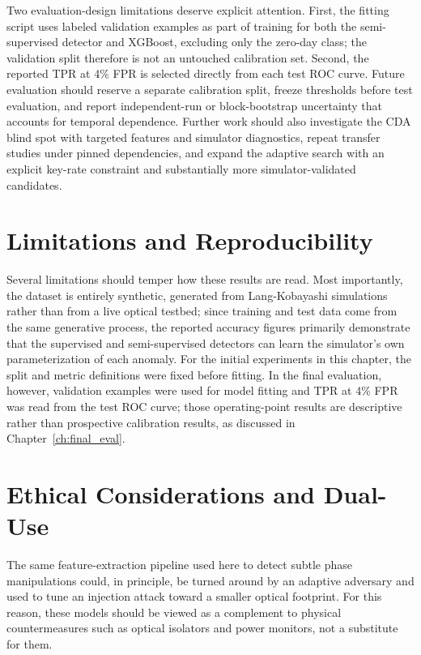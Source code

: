 \documentclass[12pt, a4paper]{report}
\begin{document}
Two evaluation-design limitations deserve explicit attention. First, the fitting script uses labeled validation examples as part of training for both the semi-supervised detector and XGBoost, excluding only the zero-day class; the validation split therefore is not an untouched calibration set. Second, the reported TPR at 4\% FPR is selected directly from each test ROC curve. Future evaluation should reserve a separate calibration split, freeze thresholds before test evaluation, and report independent-run or block-bootstrap uncertainty that accounts for temporal dependence. Further work should also investigate the CDA blind spot with targeted features and simulator diagnostics, repeat transfer studies under pinned dependencies, and expand the adaptive search with an explicit key-rate constraint and substantially more simulator-validated candidates.
\section{Limitations and Reproducibility}
Several limitations should temper how these results are read. Most importantly, the dataset is entirely synthetic, generated from Lang-Kobayashi simulations rather than from a live optical testbed; since training and test data come from the same generative process, the reported accuracy figures primarily demonstrate that the supervised and semi-supervised detectors can learn the simulator's own parameterization of each anomaly. For the initial experiments in this chapter, the split and metric definitions were fixed before fitting. In the final evaluation, however, validation examples were used for model fitting and TPR at 4\% FPR was read from the test ROC curve; those operating-point results are descriptive rather than prospective calibration results, as discussed in Chapter~\ref{ch:final_eval}.

\section{Ethical Considerations and Dual-Use}
The same feature-extraction pipeline used here to detect subtle phase manipulations could, in principle, be turned around by an adaptive adversary and used to tune an injection attack toward a smaller optical footprint. For this reason, these models should be viewed as a complement to physical countermeasures such as optical isolators and power monitors, not a substitute for them.
\end{document}
